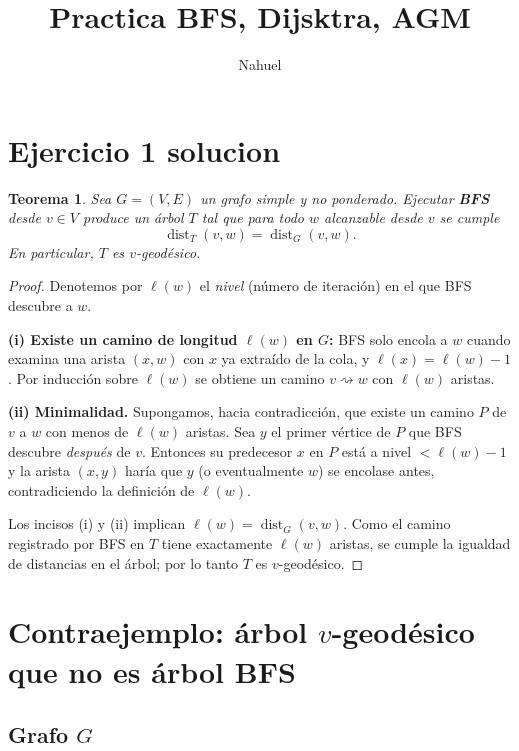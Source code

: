 \documentclass{article}
\title{Practica BFS, Dijsktra, AGM}
\author{Nahuel}
\newtheorem{theorem}{Teorema}
\begin{document}
\maketitle
\section{Ejercicio 1 solucion}
\begin{theorem}
Sea $G=(V,E)$ un grafo simple y no ponderado.
Ejecutar \textbf{BFS} desde $v\in V$ produce un árbol $T$
tal que para todo $w$ alcanzable desde $v$ se cumple
\[
\operatorname{dist}_T(v,w)=\operatorname{dist}_G(v,w).
\]
En particular, $T$ es $v$-geodésico.
\end{theorem}

\begin{proof}
Denotemos por $\ell(w)$ el \emph{nivel} (número de iteración) en el que
BFS descubre a $w$.

\textbf{(i) Existe un camino de longitud $\ell(w)$ en $G$:}
BFS solo encola a $w$ cuando examina una arista $(x,w)$ con $x$ ya
extraído de la cola, y $\ell(x)=\ell(w)-1$.  Por inducción sobre
$\ell(w)$ se obtiene un camino $v\rightsquigarrow w$ con
$\ell(w)$ aristas.

\textbf{(ii) Minimalidad.}  Supongamos, hacia contradicción, que existe
un camino $P$ de $v$ a $w$ con menos de $\ell(w)$ aristas.  Sea $y$
el primer vértice de $P$ que BFS descubre \emph{después} de $v$.
Entonces su predecesor $x$ en $P$ está a nivel $<\ell(w)-1$ y la arista
$(x,y)$ haría que $y$ (o eventualmente $w$) se encolase antes,
contradiciendo la definición de $\ell(w)$.

Los incisos (i) y (ii) implican
$\ell(w)=\operatorname{dist}_G(v,w)$.
Como el camino registrado por BFS en $T$ tiene exactamente $\ell(w)$
aristas, se cumple la igualdad de distancias en el árbol;
por lo tanto $T$ es $v$-geodésico.
\end{proof}
\section*{Contraejemplo: árbol \(v\)-geodésico que no es árbol BFS}

\subsection*{Grafo \(G\)}
\end{document}
